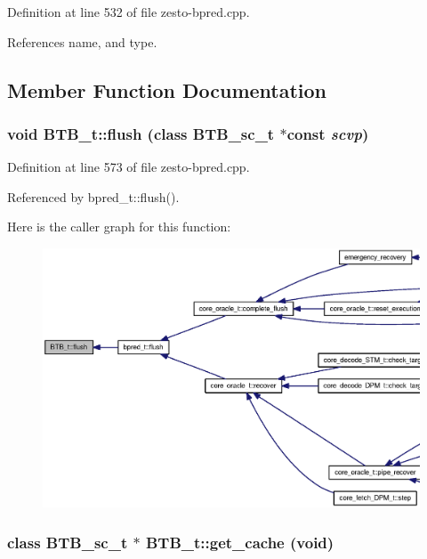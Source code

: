 Definition at line 532 of file zesto-bpred.cpp.

References name, and type.

\subsection{Member Function Documentation}
\subsubsection[{flush}]{\setlength{\rightskip}{0pt plus 5cm}void BTB\_\-t::flush (class {\bf BTB\_\-sc\_\-t} $\ast$const  {\em scvp})\hspace{0.3cm}{\tt  [virtual]}}\label{classBTB__t_4790cf808e2f4c99a92c32ed649bbc38}




Definition at line 573 of file zesto-bpred.cpp.

Referenced by bpred\_\-t::flush().

Here is the caller graph for this function:\nopagebreak
\begin{figure}[H]
\begin{center}
\leavevmode
\includegraphics[width=420pt]{classBTB__t_4790cf808e2f4c99a92c32ed649bbc38_icgraph}
\end{center}
\end{figure}
\subsubsection[{get\_\-cache}]{\setlength{\rightskip}{0pt plus 5cm}class {\bf BTB\_\-sc\_\-t} $\ast$ BTB\_\-t::get\_\-cache (void)\hspace{0.3cm}{\tt  [virtual]}}\label{classBTB__t_32e582b73ba10d49a70208b29c823af4}




